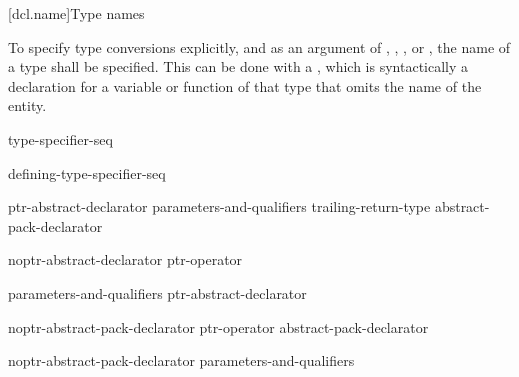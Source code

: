 \documentclass{wg21}
\begin{document}
[dcl.name]{Type names}

\pnum
{}%
To specify type conversions explicitly,
%
and as an argument of
,
,
,
or
,
the name of a type shall be specified.
This can be done with a
,
which is syntactically a declaration for a variable or function
of that type that omits the name of the entity.

\begin{bnf}
    \br
    type-specifier-seq 
\end{bnf}

\begin{bnf}
    \br
    defining-type-specifier-seq 
\end{bnf}

\begin{bnf}
    \br
    ptr-abstract-declarator\br
     parameters-and-qualifiers trailing-return-type\br
    abstract-pack-declarator
\end{bnf}

\begin{bnf}
    \br
    noptr-abstract-declarator\br
    ptr-operator 
\end{bnf}

\begin{bnf}
    \br
     parameters-and-qualifiers\br
     \terminal{[}  \terminal{]} \br
    \terminal{(} ptr-abstract-declarator \terminal{)}
\end{bnf}

\begin{bnf}
    \br
    noptr-abstract-pack-declarator\br
    ptr-operator abstract-pack-declarator
\end{bnf}

\begin{bnf}
    \br
    noptr-abstract-pack-declarator parameters-and-qualifiers\br
    \br
\end{bnf}
\end{document}
